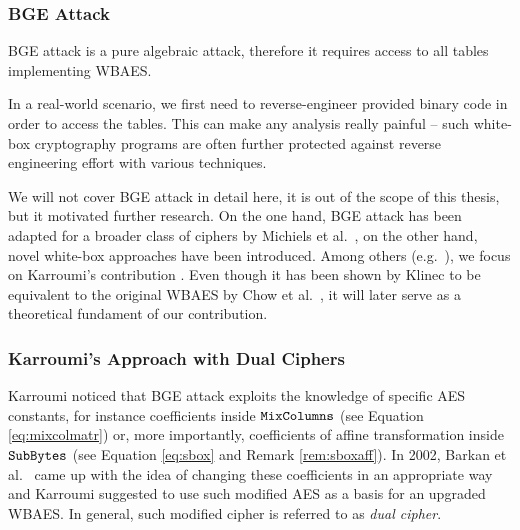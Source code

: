 
\subsubsection{BGE Attack}
	
	BGE attack is a pure algebraic attack, therefore it requires access to all tables implementing WBAES.
	
	\begin{note}
	\label{note:reverse}
		In a real-world scenario, we first need to reverse-engineer provided binary code in order to access the tables. This can make any analysis really painful -- such white-box cryptography programs are often further protected against reverse engineering effort with various techniques.
	\end{note}
	
	We will not cover BGE attack in detail here, it is out of the scope of this thesis, but it motivated further research. On the one hand, BGE attack has been adapted for a broader class of ciphers by Michiels et al.\ \cite{michiels2008cryptanalysis}, on the other hand, novel white-box approaches have been introduced. Among others (e.g.\ \cite{michiels2007cryptographic, xiao2009secure}), we focus on Karroumi's contribution \cite{karroumi2010protecting}. Even though it has been shown by Klinec \cite{klinec2013white} to be equivalent to the original WBAES by Chow et al.\ \cite{chow2002aes}, it will later serve as a theoretical fundament of our contribution.

\subsubsection{Karroumi's Approach with Dual Ciphers}
	
	Karroumi noticed that BGE attack exploits the knowledge of specific AES constants, for instance coefficients inside $\texttt{MixColumns}$ (see Equation \ref{eq:mixcolmatr}) or, more importantly, coefficients of affine transformation inside $\texttt{SubBytes}$ (see Equation \ref{eq:sbox} and Remark \ref{rem:sboxaff}). In 2002, Barkan et al.\ \cite{barkan2002many} came up with the idea of changing these coefficients in an appropriate way and Karroumi suggested to use such modified AES as a basis for an upgraded WBAES. In general, such modified cipher is referred to as {\em dual cipher}.
	
